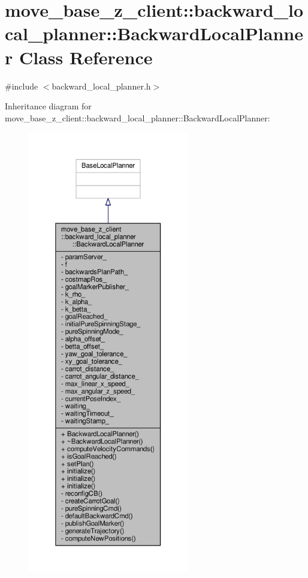 \hypertarget{classmove__base__z__client_1_1backward__local__planner_1_1BackwardLocalPlanner}{}\section{move\+\_\+base\+\_\+z\+\_\+client\+:\+:backward\+\_\+local\+\_\+planner\+:\+:Backward\+Local\+Planner Class Reference}
\label{classmove__base__z__client_1_1backward__local__planner_1_1BackwardLocalPlanner}


{\ttfamily \#include $<$backward\+\_\+local\+\_\+planner.\+h$>$}



Inheritance diagram for move\+\_\+base\+\_\+z\+\_\+client\+:\+:backward\+\_\+local\+\_\+planner\+:\+:Backward\+Local\+Planner\+:\nopagebreak
\begin{figure}[H]
\begin{center}
\leavevmode
\includegraphics[height=550pt]{classmove__base__z__client_1_1backward__local__planner_1_1BackwardLocalPlanner__inherit__graph}
\end{center}
\end{figure}


